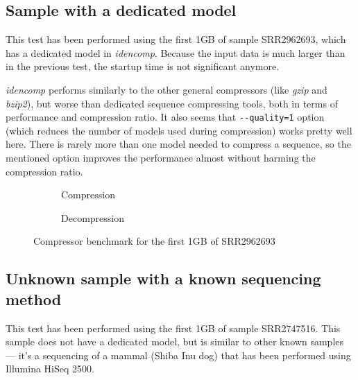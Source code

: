 \newpage

\subsection{Sample with a dedicated model}\label{subsec:sample-with-a
-dedicated-model}

This test has been performed using the first 1GB of sample SRR2962693, which
has a dedicated model in \emph{idencomp}.
Because the input data is much larger than in the previous test, the startup
time is not significant anymore.

\emph{idencomp} performs similarly to the other general compressors (like
\emph{gzip} and \emph{bzip2}), but worse than dedicated sequence compressing
tools, both in terms of performance and compression ratio.
It also seems that \texttt{{-}{-}quality=1} option (which reduces the number
of models used during compression) works pretty well here.
There is rarely more than one model needed to compress a sequence, so the
mentioned option improves the performance almost without harming the
compression ratio.

\begin{figure}[h]
    \begin{subfigure}{\textwidth}
        \centering
        
        \caption{Compression}
    \end{subfigure}
    \begin{subfigure}{\textwidth}
        \centering
        \vspace{1em}
        
        \caption{Decompression}
    \end{subfigure}
    \caption{%
        Compressor benchmark for the first 1GB of SRR2962693
    }
    \label{fig:bench-dedicated-model}
\end{figure}

\newpage

\subsection{Unknown sample with a known sequencing method}
\label{subsec:sample-with-a -known-sequencing-method}

This test has been performed using the first 1GB of sample SRR2747516.
This sample does not have a dedicated model, but is similar to other known
samples --- it's a sequencing of a mammal (Shiba Inu dog) that has been
performed using Illumina HiSeq 2500.

